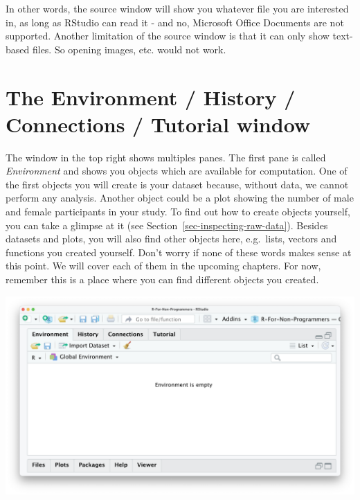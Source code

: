 \documentclass[
  letterpaper,
]{krantz}
\begin{document}
In other words, the source window will show you whatever file you are
interested in, as long as RStudio can read it - and no, Microsoft Office
Documents are not supported. Another limitation of the source window is
that it can only show text-based files. So opening images, etc. would
not work.

\section{The Environment / History / Connections / Tutorial
window}\label{sec-the-environment-history-connections-tutorial-window}

The window in the top right shows multiples panes. The first pane is
called \emph{Environment} and shows you objects which are available for
computation. One of the first objects you will create is your dataset
because, without data, we cannot perform any analysis. Another object
could be a plot showing the number of male and female participants in
your study. To find out how to create objects yourself, you can take a
glimpse at it (see Section~\ref{sec-inspecting-raw-data}). Besides
datasets and plots, you will also find other objects here, e.g.~lists,
vectors and functions you created yourself. Don't worry if none of these
words makes sense at this point. We will cover each of them in the
upcoming chapters. For now, remember this is a place where you can find
different objects you created.

\includegraphics{images/chapter_04_img/04_environment_history_etc/01_rstudio_environment.png}
\end{document}
